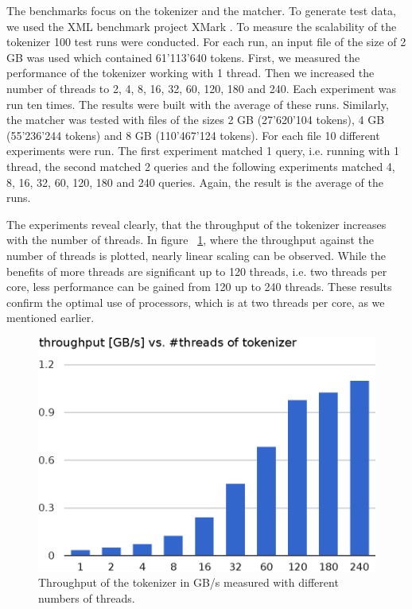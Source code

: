 The benchmarks focus on the tokenizer and the matcher. To generate test data, we used the XML benchmark project XMark \cite{Schmidt2002}. To measure the scalability of the tokenizer 100 test runs were conducted. For each run, an input file of the size of 2 GB was used which contained 61'113'640 tokens. First, we measured the performance of the tokenizer working with 1 thread. Then we increased the number of threads to 2, 4, 8, 16, 32, 60, 120, 180 and 240. Each experiment was run ten times. The results were built with the average of these runs. Similarly, the matcher was tested with files of the sizes 2 GB (27'620'104 tokens), 4 GB (55'236'244 tokens) and 8 GB (110'467'124 tokens). For each file 10 different experiments were run. The first experiment matched 1 query, i.e. running with 1 thread, the second matched 2 queries and the following experiments matched 4, 8, 16, 32, 60, 120, 180 and 240 queries. Again, the result is the average of the runs.

The experiments reveal clearly, that the throughput of the tokenizer increases with the number of threads. In figure ~\ref{tokenizer_throughput}, where the throughput against the number of threads is plotted, nearly linear scaling can be observed. While the benefits of more threads are significant up to 120 threads, i.e. two threads per core, less performance can be gained from 120 up to 240 threads. These results confirm the optimal use of processors, which is at two threads per core, as we mentioned earlier.

\begin{figure}[h]\centering
  \includegraphics[scale=.66]{img/tokenizer_throughput_2.eps}
  \caption{Throughput of the tokenizer in GB/s measured with different numbers of threads.
  \label{tokenizer_throughput}}
\end{figure}

